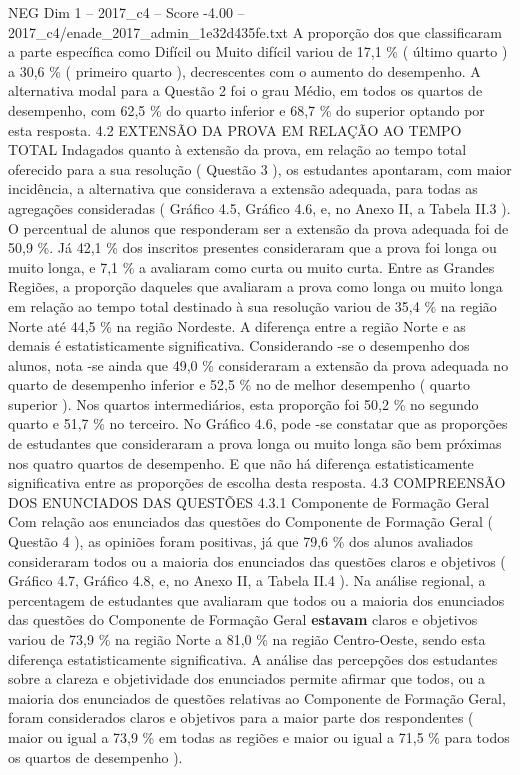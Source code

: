 \begin{textsample}{NEG Dim 1 – 2017\_c4 – Score -4.00 – 2017\_c4/enade\_2017\_admin\_1e32d435fe.txt}
A proporção dos que classificaram a parte específica como Difícil ou Muito difícil variou de 17,1 \% ( último quarto ) a 30,6 \% ( primeiro quarto ), decrescentes com o aumento do desempenho.
A alternativa modal para a Questão 2 foi o grau Médio, em todos os quartos de desempenho, com 62,5 \% do quarto inferior e 68,7 \% do superior optando por esta resposta. 4.2 EXTENSÃO DA PROVA EM RELAÇÃO AO TEMPO TOTAL Indagados quanto à extensão da prova, em relação ao tempo total oferecido para a sua resolução ( Questão 3 ), os estudantes apontaram, com maior incidência, a alternativa que considerava a extensão adequada, para todas as agregações consideradas ( Gráfico 4.5, Gráfico 4.6, e, no Anexo II, a Tabela II.3 ).
O percentual de alunos que responderam ser a extensão da prova adequada foi de 50,9 \%.
Já 42,1 \% dos inscritos presentes consideraram que a prova foi longa ou muito longa, e 7,1 \% a avaliaram como curta ou muito curta.
Entre as Grandes Regiões, a proporção daqueles que avaliaram a prova como longa ou muito longa em relação ao tempo total destinado à sua resolução variou de 35,4 \% na região Norte até 44,5 \% na região Nordeste.
A diferença entre a região Norte e as demais é estatisticamente significativa.
Considerando -se o desempenho dos alunos, nota -se ainda que 49,0 \% consideraram a extensão da prova adequada no quarto de desempenho inferior e 52,5 \% no de melhor desempenho ( quarto superior ).
Nos quartos intermediários, esta proporção foi 50,2 \% no segundo quarto e 51,7 \% no terceiro.
No Gráfico 4.6, pode -se constatar que as proporções de estudantes que consideraram a prova longa ou muito longa são bem próximas nos quatro quartos de desempenho.
E que não há diferença estatisticamente significativa entre as proporções de escolha desta resposta. 4.3 COMPREENSÃO DOS ENUNCIADOS DAS QUESTÕES 4.3.1 Componente de Formação Geral Com relação aos enunciados das questões do Componente de Formação Geral ( Questão 4 ), as opiniões foram positivas, já que 79,6 \% dos alunos avaliados consideraram todos ou a maioria dos enunciados das questões claros e objetivos ( Gráfico 4.7, Gráfico 4.8, e, no Anexo II, a Tabela II.4 ).
Na análise regional, a percentagem de estudantes que avaliaram que todos ou a maioria dos enunciados das questões do Componente de Formação Geral \textbf{estavam} claros e objetivos variou de 73,9 \% na região Norte a 81,0 \% na região Centro-Oeste, sendo esta diferença estatisticamente significativa.
A análise das percepções dos estudantes sobre a clareza e objetividade dos enunciados permite afirmar que todos, ou a maioria dos enunciados de questões relativas ao Componente de Formação Geral, foram considerados claros e objetivos para a maior parte dos respondentes ( maior ou igual a 73,9 \% em todas as regiões e maior ou igual a 71,5 \% para todos os quartos de desempenho ).

\end{textsample}

